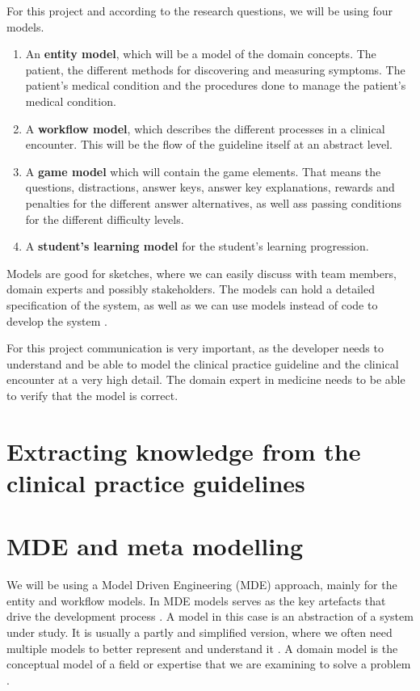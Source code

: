 
For this project and according to the research questions, we will be using four models.
\begin{enumerate}
	\item An \textbf{entity model}, which will be a model of the domain concepts. The patient, the different methods for discovering and measuring symptoms. The patient's medical condition and the procedures done to manage the patient's medical condition.
	\item A \textbf{workflow model}, which describes the different processes in a clinical encounter. This will be the flow of the guideline itself at an abstract level.
	\item A \textbf{game model} which will contain the game elements. That means the questions, distractions, answer keys, answer key explanations, rewards and penalties for the different answer alternatives, as well ass passing conditions for the different difficulty levels.
	\item A \textbf{student's learning model} for the student's learning progression.
\end{enumerate}

Models are good for sketches, where we can easily discuss with team members, domain experts and possibly stakeholders. The models can hold a detailed specification of the system, as well as we can use models instead of code to develop the system \parencite{Brambilla2017}.

For this project communication is very important, as the developer needs to understand and be able to model the clinical practice guideline and the clinical encounter at a very high detail. The domain expert in medicine needs to be able to verify that the model is correct.

\section{Extracting knowledge from the clinical  practice guidelines}

\section{MDE and meta modelling}
We will be using a Model Driven Engineering (MDE) approach, mainly for the entity and workflow models. In MDE models serves as the key artefacts that drive the development process \parencite{RodriguesdaSilva2015}. A model in this case is an abstraction of a system under study. It is usually a partly and simplified version, where we often need multiple models to better represent and understand it \parencite{RodriguesdaSilva2015}. A domain model is the conceptual model of a field or expertise that we are examining to solve a problem \parencite{Brambilla2017}.

